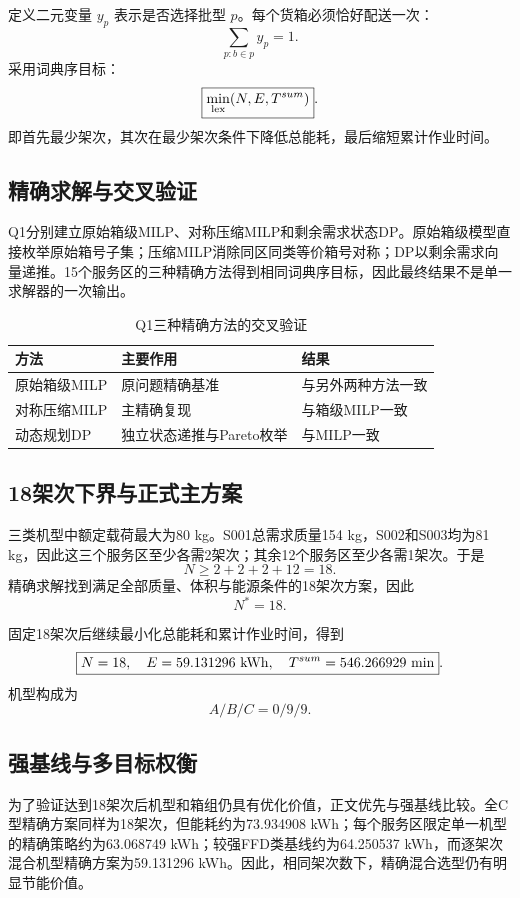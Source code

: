 \documentclass[UTF8,a4paper,12pt]{ctexart}
\begin{document}
定义二元变量 $y_p$ 表示是否选择批型 $p$。每个货箱必须恰好配送一次：
\[
\sum_{p:b\in p}y_p=1.
\]
采用词典序目标：
\[
\boxed{
\min_{\rm lex}(N,E,T^{sum})
}.
\]
即首先最少架次，其次在最少架次条件下降低总能耗，最后缩短累计作业时间。

\subsection{精确求解与交叉验证}

Q1分别建立原始箱级MILP、对称压缩MILP和剩余需求状态DP。原始箱级模型直接枚举原始箱号子集；压缩MILP消除同区同类等价箱号对称；DP以剩余需求向量递推。15个服务区的三种精确方法得到相同词典序目标，因此最终结果不是单一求解器的一次输出。

\begin{table}[H]
\centering
\caption{Q1三种精确方法的交叉验证}
\begin{tabular}{lll}
\toprule
方法 & 主要作用 & 结果\\
\midrule
原始箱级MILP & 原问题精确基准 & 与另外两种方法一致\\
对称压缩MILP & 主精确复现 & 与箱级MILP一致\\
动态规划DP & 独立状态递推与Pareto枚举 & 与MILP一致\\
\bottomrule
\end{tabular}
\end{table}

\subsection{18架次下界与正式主方案}

三类机型中额定载荷最大为80 kg。S001总需求质量154 kg，S002和S003均为81 kg，因此这三个服务区至少各需2架次；其余12个服务区至少各需1架次。于是
\[
N\ge2+2+2+12=18.
\]
精确求解找到满足全部质量、体积与能源条件的18架次方案，因此
\[
\boxed{N^*=18}.
\]

固定18架次后继续最小化总能耗和累计作业时间，得到
\[
\boxed{
N=18,\quad
E=59.131296\ {\rm kWh},\quad
T^{sum}=546.266929\ {\rm min}
}.
\]
机型构成为
\[
A/B/C=0/9/9.
\]

\subsection{强基线与多目标权衡}

为了验证达到18架次后机型和箱组仍具有优化价值，正文优先与强基线比较。全C型精确方案同样为18架次，但能耗约为73.934908 kWh；每个服务区限定单一机型的精确策略约为63.068749 kWh；较强FFD类基线约为64.250537 kWh，而逐架次混合机型精确方案为59.131296 kWh。因此，相同架次数下，精确混合选型仍有明显节能价值。
\end{document}
